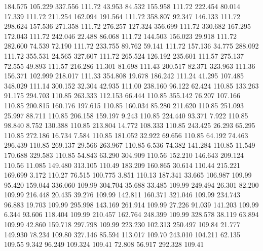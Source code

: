  184.575  105.229  337.556       111.72
  43.953   84.532  155.958       111.72
 222.454   80.014   17.339       111.72
 211.254  162.094  191.564       111.72
 358.807   92.347  146.133       111.72
 298.624  157.536  271.358       111.72
 276.257  127.324  356.699       111.72
 330.682  167.295  172.043       111.72
 242.046   22.488   86.068       111.72
 144.503  156.023   29.918       111.72
 282.600   74.539   72.190       111.72
 233.755   89.762   59.141       111.72
 157.136   34.775  288.092       111.72
 355.531   24.565  327.607       111.72
 265.524  126.192  235.601       111.57
 275.137   72.555   49.893       111.57
 216.286   11.301   81.698       111.43
 200.517   82.371  323.963       111.36
 156.371  102.999  218.017       111.33
 354.808   19.678  186.242       111.24
  41.295  107.485  348.029       111.14
 300.152   32.304   42.935       111.00
 238.160   96.122   62.424       110.85
 133.263   91.175  294.703       110.85
 263.333  112.153   66.444       110.85
 355.142   76.207  107.166       110.85
 200.815  160.176  197.615       110.85
 160.034   85.280  211.620       110.85
 251.093   25.997   88.711       110.85
 206.158  159.197    9.243       110.85
 224.440   93.371    7.922       110.85
  98.840    8.752  130.388       110.85
 213.804   14.772  108.333       110.85
 243.425   26.293   65.295       110.85
 272.186   16.734    7.584       110.85
 181.052   32.922   69.656       110.85
  64.192   74.463  296.439       110.85
 269.137   29.566  263.967       110.85
   6.536   74.382  141.284       110.85
  11.549  170.688  329.583       110.85
  54.843   63.290  304.909       110.56
 152.210  146.643  209.124       110.56
  11.085  149.480  313.105       110.49
 183.209  160.865   30.614       110.44
 215.221  169.699    3.172       110.27
  76.515  100.775    3.851       110.13
 187.341   33.665  106.987       109.99
  95.420  159.044  336.060       109.99
 304.704   35.688   33.485       109.99
 249.494   26.301   82.200       109.99
 216.448   20.435   39.276       109.99
 142.811  160.371  321.046       109.99
 234.743   96.883   19.703       109.99
 295.998  143.169  261.914       109.99
  27.226   91.039  141.203       109.99
   6.344   93.606  118.404       109.99
 210.457  162.764  248.399       109.99
 328.578   38.119   63.894       109.99
  42.860  159.718  297.798       109.99
 223.230  102.313  250.497       109.84
  21.777  149.930   78.234       109.80
 327.146   85.594  113.017       109.70
 243.010  104.211   62.135       109.55
   9.342   96.249  109.324       109.41
  72.808   56.917  292.328       109.41
